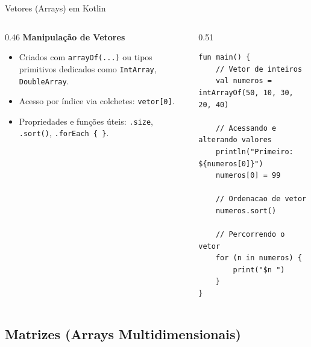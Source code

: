 \documentclass[aspectratio=169]{beamer}
\begin{document}
\begin{frame}[fragile]{Vetores (Arrays) em Kotlin}
  \begin{columns}[T]
    \begin{column}{0.46\textwidth}
      \textbf{Manipulação de Vetores}
      \vspace{0.3em}
      \begin{itemize}\small
        \item Criados com \texttt{arrayOf(...)} ou tipos primitivos dedicados como \texttt{IntArray}, \texttt{DoubleArray}.
        \item Acesso por índice via colchetes: \texttt{vetor[0]}.
        \item Propriedades e funções úteis: \texttt{.size}, \texttt{.sort()}, \texttt{.forEach \{ \}}.
      \end{itemize}
    \end{column}
    \begin{column}{0.51\textwidth}
\begin{lstlisting}[style=KotlinStyle]
fun main() {
    // Vetor de inteiros
    val numeros = intArrayOf(50, 10, 30, 20, 40)

    // Acessando e alterando valores
    println("Primeiro: ${numeros[0]}")
    numeros[0] = 99

    // Ordenacao de vetor
    numeros.sort()

    // Percorrendo o vetor
    for (n in numeros) {
        print("$n ")
    }
}
\end{lstlisting}
    \end{column}
  \end{columns}
\end{frame}

\subsection{Matrizes (Arrays Multidimensionais)}
\end{document}
